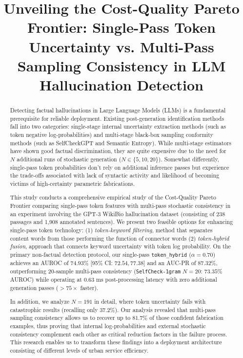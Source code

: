 \documentclass[conference]{IEEEtran}
\begin{document}
\title{Unveiling the Cost-Quality Pareto Frontier: Single-Pass Token Uncertainty vs. Multi-Pass Sampling Consistency in LLM Hallucination Detection}

\author{
}

\maketitle

\begin{abstract}
Detecting factual hallucinations in Large Language Models (LLMs) is a fundamental prerequisite for reliable deployment. Existing post-generation identification methods fall into two categories: single-stage internal uncertainty extraction methods (such as token negative log-probabilities) and multi-stage black-box sampling conformity methods (such as SelfCheckGPT and Semantic Entropy). While multi-stage estimators have shown good factual discrimination, they are quite expensive due to the need for $N$ additional runs of stochastic generation ($N \in \{5, 10, 20\}$). Somewhat differently, single-pass token probabilities don’t rely on additional inference passes but experience the trade-offs associated with lack of syntactic activity and likelihood of becoming victims of high-certainty parametric fabrications. 

This study conducts a comprehensive empirical study of the Cost-Quality Pareto Frontier comparing single-pass token features with multi-pass stochastic consistency in an experiment involving the GPT-3 WikiBio hallucination dataset (consisting of 238 passages and 1,908 annotated sentences). We present two feasible options for enhancing single-pass token technology: (1) \textit{token-keyword filtering},  method that separates content words from those performing the function of connector words (2) \textit{token-hybrid fusion},  approach that connects keyword uncertainty with token log probability. On the primary non-factual detection protocol, our single-pass \texttt{token\_hybrid} ($\alpha=0.70$) achieves an AUROC of $\mathbf{74.93\%}$ [95\% CI: $72.54, 77.38$] and an AUC-PR of $\mathbf{87.32\%}$, outperforming 20-sample multi-pass consistency (\texttt{SelfCheck-1gram} $N=20$: $73.35\%$ AUROC) while operating at $0.63\text{ ms}$ post-processing latency with zero additional generation passes ($>75\times$ faster). 

In addition, we analyze $N=191$ in detail, where token uncertainty fails with catastrophic results (recalling only $37.2\%$). Our analysis revealed that multi-pass sampling consistency allows us to recover up to $\mathbf{81.7\%}$ of those confident fabrication examples, thus proving that internal log-probabilities and external stochastic consistency complement each other as critical reduction factors in the failure process. This research enables us to transform these findings into a deployment architecture consisting of different levels of urban service efficiency.
\end{abstract}
\end{document}
